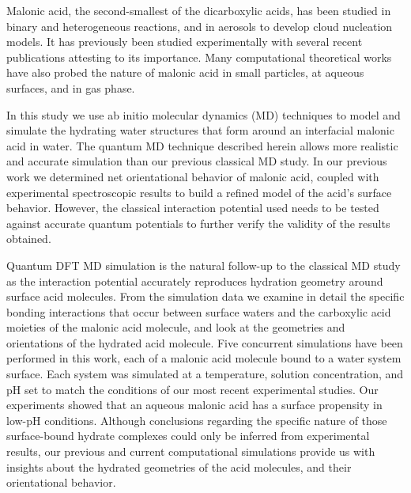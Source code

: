 Malonic acid, the second-smallest of the dicarboxylic acids, has been studied in binary and heterogeneous reactions, and in aerosols to develop cloud nucleation models.\cite{Giebl2002,Finlayson-Pitts2009} It has previously been studied experimentally with several recent publications attesting to its importance.\cite{Parsons2004,Braban2003,Hansen2004,Hyvarinen2006,Riipinen2007} Many computational theoretical works have also probed the nature of malonic acid in small particles, at aqueous surfaces, and in gas phase.\cite{Nguyen2005,Merchan1984,Ma2011}

In this study we use ab initio molecular dynamics (MD) techniques to model and simulate the hydrating water structures that form around an interfacial malonic acid in water. The quantum MD technique described herein allows more realistic and accurate simulation than our previous classical MD study.\cite{Blower2012} In our previous work we determined net orientational behavior of malonic acid, coupled with experimental spectroscopic results to build a refined model of the acid's surface behavior. However, the classical interaction potential used needs to be tested against accurate quantum potentials to further verify the validity of the results obtained.

Quantum DFT MD simulation is the natural follow-up to the classical MD study as the interaction potential accurately reproduces hydration geometry around surface acid molecules. From the simulation data we examine in detail the specific bonding interactions that occur between surface waters and the carboxylic acid moieties of the malonic acid molecule, and look at the geometries and orientations of the hydrated acid molecule. Five concurrent simulations have been performed in this work, each of a malonic acid molecule bound to a water system surface. Each system was simulated at a temperature, solution concentration, and pH set to match the conditions of our most recent experimental studies.\cite{Blower2012} Our experiments showed that an aqueous malonic acid has a surface propensity in low-pH conditions. Although conclusions regarding the specific nature of those surface-bound hydrate complexes could only be inferred from experimental results, our previous and current computational simulations provide us with insights about the hydrated geometries of the acid molecules, and their orientational behavior.

